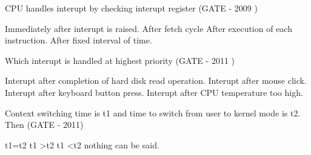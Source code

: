 \vspace{0.08in}


\begin{minipage}{\linewidth}

  \question CPU handles interupt by checking interupt register (GATE - 2009 )

  \begin{choices}
    \choice Immediately after interupt is raised.
    \choice After fetch cycle
    \choice After execution of each instruction.
    \choice After fixed interval of time.
  \end{choices}

  \end{minipage}

\vspace{0.08in}


\begin{minipage}{\linewidth}

  \question Which interupt is handled at highest priority (GATE - 2011 )

  \begin{choices}
    \choice Interupt after completion of hard disk read operation.
    \choice Interupt after mouse click.
    \choice Interupt after keyboard button press.
    \choice Interupt after CPU temperature too high.
  \end{choices}

  \end{minipage}

\vspace{0.08in}



\begin{minipage}{\linewidth}

  \question Context switching time is t1 and time to switch from user to kernel mode is t2. Then (GATE - 2011)

  \begin{oneparchoices}
    \choice t1=t2
    \choice t1 \textgreater  t2
    \choice t1 \textless  t2
    \choice nothing can be said.
  \end{oneparchoices}


  \end{minipage}

